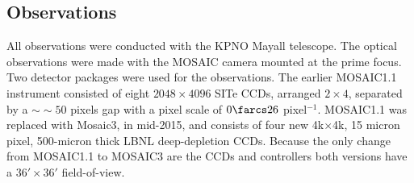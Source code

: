 \documentclass[apj, revtex4-1]{emulateapj}
\begin{document}


\subsection{Observations}\label{sec: observations}
All observations were conducted with the KPNO Mayall telescope. The optical observations were made with the MOSAIC camera mounted at the prime focus. Two detector packages were used for the observations. The earlier MOSAIC1.1 instrument consisted of eight $2048\times4096$ SITe CCDs, arranged $2\times4$, separated by a $∼\sim50$ pixels gap with a pixel scale of $0\farcs26$ pixel$^{-1}$. MOSAIC1.1 was replaced with Mosaic3, in mid-2015, and consists of four new 4k$\times$4k, 15 micron pixel, 500-micron thick LBNL deep-depletion CCDs. Because the only change from MOSAIC1.1 to MOSAIC3 are the CCDs and controllers both versions have a $36' \times 36'$ field-of-view.
\end{document}
